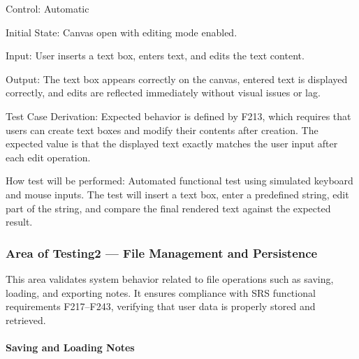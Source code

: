 \documentclass[12pt, titlepage]{article}
\begin{document}
\begin{enumerate}
Control: Automatic

Initial State: Canvas open with editing mode enabled.

Input: User inserts a text box, enters text, and edits the text content.

Output:
The text box appears correctly on the canvas, entered text is displayed correctly, and edits are reflected immediately without visual issues or lag.

Test Case Derivation:
Expected behavior is defined by F213, which requires that users can create text boxes and modify their contents after creation.
The expected value is that the displayed text exactly matches the user input after each edit operation.

How test will be performed: Automated functional test using simulated keyboard and mouse inputs. The test will insert a text box, enter a predefined string, edit part of the string, and compare the final rendered text against the expected result.

\end{enumerate}

\subsubsection{Area of Testing2 — File Management and Persistence}

This area validates system behavior related to file operations such as saving, loading, and exporting notes.
It ensures compliance with SRS functional requirements F217–F243, verifying that user data is properly stored and retrieved.

\paragraph{Saving and Loading Notes}
\end{document}
